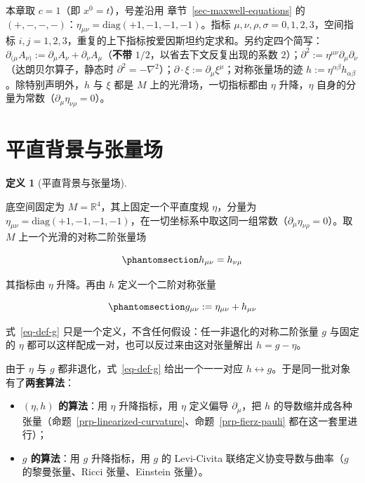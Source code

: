 \documentclass[
  chinese,
  a4paper,
  UTF8,
  12pt,
  oneside,
  openany]{ctexbook}
\providecommand{\tightlist}{%
  \setlength{\itemsep}{0pt}\setlength{\parskip}{0pt}}
\theoremstyle{plain}
\theoremstyle{plain}
\theoremstyle{plain}
\theoremstyle{definition}
\newtheorem{definition}{定义}[chapter]
\theoremstyle{plain}
\theoremstyle{plain}
\theoremstyle{remark}
\begin{document}
本章取 \(c=1\)（即 \(x^{0}=t\)），号差沿用
章节~\ref{sec-maxwell-equations} 的
\((+,-,-,-)\)：\(\eta_{\mu\nu}=\mathrm{diag}(+1,-1,-1,-1)\)。指标
\(\mu,\nu,\rho,\sigma=0,1,2,3\)，空间指标
\(i,j=1,2,3\)，重复的上下指标按爱因斯坦约定求和。另约定四个简写：\(\partial_{(\mu}A_{\nu)}:=\partial_{\mu}A_{\nu}+\partial_{\nu}A_{\mu}\)（\textbf{不带}
\(1/2\)，以省去下文反复出现的系数
\(2\)）；\(\partial^{2}:=\eta^{\mu\nu}\partial_{\mu}\partial_{\nu}\)（达朗贝尔算子，静态时
\(\partial^{2}=-\nabla^{2}\)）；\(\partial\cdot\xi:=\partial_{\mu}\xi^{\mu}\)；对称张量场的迹
\(h:=\eta^{\alpha\beta}h_{\alpha\beta}\)。除特别声明外，\(h\) 与 \(\xi\)
都是 \(M\) 上的光滑场，一切指标都由 \(\eta\) 升降，\(\eta\)
自身的分量为常数（\(\partial_{\mu}\eta_{\nu\rho}=0\)）。

\section{平直背景与张量场}\label{sec-fsg-field}

\begin{definition}[平直背景与张量场]\protect\hypertarget{def-flat-background}{}\label{def-flat-background}

底空间固定为 \(M=\mathbb{R}^{4}\)，其上固定一个平直度规 \(\eta\)，分量为
\(\eta_{\mu\nu}=\mathrm{diag}(+1,-1,-1,-1)\)，在一切坐标系中取这同一组常数（\(\partial_{\mu}\eta_{\nu\rho}=0\)）。取
\(M\) 上一个光滑的对称二阶张量场

\begin{equation}\protect\phantomsection\label{eq-grav-field}{
h_{\mu\nu}=h_{\nu\mu}
}\end{equation}

其指标由 \(\eta\) 升降。再由 \(h\) 定义一个二阶对称张量

\begin{equation}\protect\phantomsection\label{eq-def-g}{
g_{\mu\nu} := \eta_{\mu\nu}+h_{\mu\nu}
}\end{equation}

式~\ref{eq-def-g} 只是一个定义，不含任何假设：任一非退化的对称二阶张量
\(g\) 与固定的 \(\eta\) 都可以这样配成一对，也可以反过来由这对张量解出
\(h=g-\eta\)。

\end{definition}

由于 \(\eta\) 与 \(g\) 都非退化，式~\ref{eq-def-g} 给出一个一一对应
\(h\leftrightarrow g\)。于是同一批对象有了\textbf{两套算法}：

\begin{itemize}
\tightlist
\item
  \textbf{\((\eta,h)\) 的算法}：用 \(\eta\) 升降指标，用 \(\eta\)
  定义偏导 \(\partial_{\mu}\)，把 \(h\)
  的导数缩并成各种张量（命题~\ref{prp-linearized-curvature}、命题~\ref{prp-fierz-pauli}
  都在这一套里进行）；
\item
  \textbf{\(g\) 的算法}：用 \(g\) 升降指标，用 \(g\) 的 Levi-Civita
  联络定义协变导数与曲率（\(g\) 的黎曼张量、Ricci 张量、Einstein
  张量）。
\end{itemize}
\end{document}
